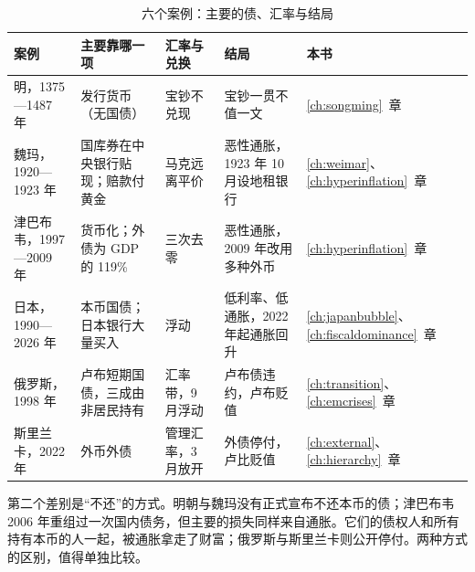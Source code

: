 \begin{table}[htbp]\centering\small
\caption{六个案例：主要的债、汇率与结局}\label{tab:intro-cases}
\begin{tabularx}{\linewidth}{@{}l Y Y Y l@{}}
\toprule
案例 & 主要靠哪一项 & 汇率与兑换 & 结局 & 本书 \\\midrule
明，1375—1487 年 & 发行货币（无国债） & 宝钞不兑现 & 宝钞一贯不值一文 & \ref{ch:songming}~章 \\
魏玛，1920—1923 年 & 国库券在中央银行贴现；赔款付黄金 & 马克远离平价 & 恶性通胀，1923 年 10 月设地租银行 & \ref{ch:weimar}、\ref{ch:hyperinflation}~章 \\
津巴布韦，1997—2009 年 & 货币化；外债为 GDP 的 119\% & 三次去零 & 恶性通胀，2009 年改用多种外币 & \ref{ch:hyperinflation}~章 \\
日本，1990—2026 年 & 本币国债；日本银行大量买入 & 浮动 & 低利率、低通胀，2022 年起通胀回升 & \ref{ch:japanbubble}、\ref{ch:fiscaldominance}~章 \\
俄罗斯，1998 年 & 卢布短期国债，三成由非居民持有 & 汇率带，9 月浮动 & 卢布债违约，卢布贬值 & \ref{ch:transition}、\ref{ch:emcrises}~章 \\
斯里兰卡，2022 年 & 外币外债 & 管理汇率，3 月放开 & 外债停付，卢比贬值 & \ref{ch:external}、\ref{ch:hierarchy}~章 \\
\bottomrule
\end{tabularx}
\end{table}


第二个差别是“不还”的方式。明朝与魏玛没有正式宣布不还本币的债；津巴布韦 2006 年重组过一次国内债务，但主要的损失同样来自通胀。它们的债权人和所有持有本币的人一起，被通胀拿走了财富；俄罗斯与斯里兰卡则公开停付。两种方式的区别，值得单独比较。

